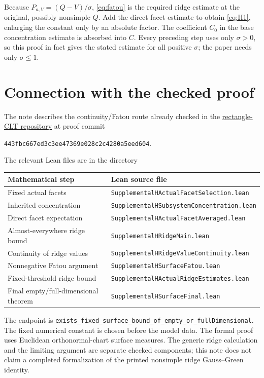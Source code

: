 \documentclass[11pt]{article}
\begin{document}
Because $P_{a,V}=(Q-V)/\sigma$, \eqref{eq:fatou} is the required
ridge estimate at the original, possibly nonsimple $Q$. Add the
direct facet estimate to obtain \eqref{eq:H1}, enlarging the constant
only by an absolute factor. The coefficient $C_0$ in the base
concentration estimate is absorbed into $C$. Every preceding step
uses only $\sigma>0$, so this proof in fact gives the stated estimate
for all positive $\sigma$; the paper needs only $\sigma\le1$.

\section*{Connection with the checked proof}

The note describes the continuity/Fatou route already checked in the
\href{https://github.com/VC2015/rectangle-clt-singular}{rectangle-CLT repository}
at proof commit
\begin{center}
\texttt{443fbc667ed3c3ee47369e028c2c4280a5eed604}.
\end{center}
The relevant Lean files are in the directory
\begin{center}
\small{}
\end{center}
\begin{center}
\small
\begin{tabular}{@{}p{}p{}@{}}
\toprule
Mathematical step & Lean source file\\
\midrule
Fixed actual facets & \texttt{SupplementalHActualFacetSelection.lean}\\
Inherited concentration & \texttt{SupplementalHSubsystemConcentration.lean}\\
Direct facet expectation & \texttt{SupplementalHActualFacetAveraged.lean}\\
Almost-everywhere ridge bound & \texttt{SupplementalHRidgeMain.lean}\\
Continuity of ridge values & \texttt{SupplementalHRidgeValueContinuity.lean}\\
Nonnegative Fatou argument & \texttt{SupplementalHSurfaceFatou.lean}\\
Fixed-threshold ridge bound & \texttt{SupplementalHActualRidgeEstimates.lean}\\
Final empty/full-dimensional theorem & \texttt{SupplementalHSurfaceFinal.lean}\\
\bottomrule
\end{tabular}
\end{center}
The endpoint is
\texttt{exists\_fixed\_surface\_bound\_of\_empty\_or\_fullDimensional}.
The fixed numerical constant is chosen before the model data. The
formal proof uses Euclidean orthonormal-chart surface measures.
The generic ridge calculation and the limiting argument are separate
checked components; this note does not claim a completed formalization
of the printed nonsimple ridge Gauss--Green identity.
\end{document}

